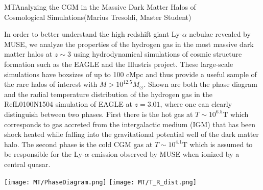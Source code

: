 \begin{section}{MT}{Analyzing the CGM in the Massive Dark Matter Halos of \\
    \hspace*{4cm} Cosmological Simulations}{(Marius Tresoldi, Master Student)}
  \begin{minipage}{0.52\linewidth}
{\small In order to better understand the high redshift giant
      Ly-$\alpha$ nebulae revealed by MUSE, we analyze the properties of the
      hydrogen gas in the most massive dark matter halos at $z \sim 3$ using
      hydrodynamical simulations of cosmic structure formation such as the EAGLE
      and the Illustris project. These large-scale simulations have boxsizes of
      up to 100 cMpc and thus provide a useful sample of the rare halos of
      interest with $M >10^{12.5} M_{\odot}$. Shown are both the phase diagram and
      the radial
      temperature distribution of the hydrogen gas in the RefL0100N1504
      simulation of EAGLE at $z=3.01$, where one can clearly distinguish between
      two phases. First there is the hot gas at $T \sim 10^{6.5} \mathrm{T}$ which
      corresponds to gas accreted from the intergalactic medium (IGM) that has
      been shock heated while falling into the gravitational potential well of
      the dark matter halo. The second phase is the cold CGM gas at $T \sim
      10^{4.1} \mathrm{T}$ which is assumed to be responsible for the Ly-$\alpha$
      emission observed by MUSE when ionized by a central quasar.}
  \end{minipage}
  \hfill
  \begin{minipage}{0.42\linewidth}
      \texttt{[image: MT/PhaseDiagram.png]}
      \texttt{[image: MT/T\_R\_dist.png]}
  \end{minipage}
\end{section}
